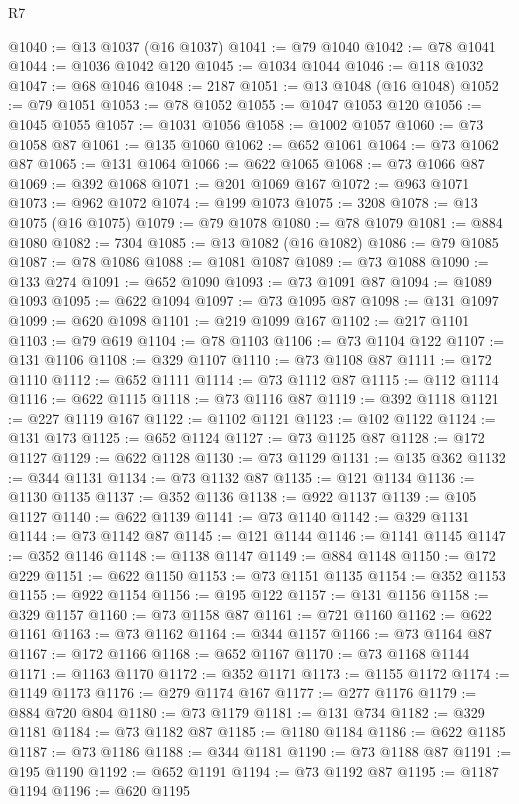 \begin{lexlean}{R7}
\begin{coremodule}
@1040 := @13 @1037 (@16 @1037)
@1041 := @79 @1040
@1042 := @78 @1041
@1044 := @1036 @1042 @120
@1045 := @1034 @1044
@1046 := @118 @1032
@1047 := @68 @1046
@1048 := 2187
@1051 := @13 @1048 (@16 @1048)
@1052 := @79 @1051
@1053 := @78 @1052
@1055 := @1047 @1053 @120
@1056 := @1045 @1055
@1057 := @1031 @1056
@1058 := @1002 @1057
@1060 := @73 @1058 @87
@1061 := @135 @1060
@1062 := @652 @1061
@1064 := @73 @1062 @87
@1065 := @131 @1064
@1066 := @622 @1065
@1068 := @73 @1066 @87
@1069 := @392 @1068
@1071 := @201 @1069 @167
@1072 := @963 @1071
@1073 := @962 @1072
@1074 := @199 @1073
@1075 := 3208
@1078 := @13 @1075 (@16 @1075)
@1079 := @79 @1078
@1080 := @78 @1079
@1081 := @884 @1080
@1082 := 7304
@1085 := @13 @1082 (@16 @1082)
@1086 := @79 @1085
@1087 := @78 @1086
@1088 := @1081 @1087
@1089 := @73 @1088
@1090 := @133 @274
@1091 := @652 @1090
@1093 := @73 @1091 @87
@1094 := @1089 @1093
@1095 := @622 @1094
@1097 := @73 @1095 @87
@1098 := @131 @1097
@1099 := @620 @1098
@1101 := @219 @1099 @167
@1102 := @217 @1101
@1103 := @79 @619
@1104 := @78 @1103
@1106 := @73 @1104 @122
@1107 := @131 @1106
@1108 := @329 @1107
@1110 := @73 @1108 @87
@1111 := @172 @1110
@1112 := @652 @1111
@1114 := @73 @1112 @87
@1115 := @112 @1114
@1116 := @622 @1115
@1118 := @73 @1116 @87
@1119 := @392 @1118
@1121 := @227 @1119 @167
@1122 := @1102 @1121
@1123 := @102 @1122
@1124 := @131 @173
@1125 := @652 @1124
@1127 := @73 @1125 @87
@1128 := @172 @1127
@1129 := @622 @1128
@1130 := @73 @1129
@1131 := @135 @362
@1132 := @344 @1131
@1134 := @73 @1132 @87
@1135 := @121 @1134
@1136 := @1130 @1135
@1137 := @352 @1136
@1138 := @922 @1137
@1139 := @105 @1127
@1140 := @622 @1139
@1141 := @73 @1140
@1142 := @329 @1131
@1144 := @73 @1142 @87
@1145 := @121 @1144
@1146 := @1141 @1145
@1147 := @352 @1146
@1148 := @1138 @1147
@1149 := @884 @1148
@1150 := @172 @229
@1151 := @622 @1150
@1153 := @73 @1151 @1135
@1154 := @352 @1153
@1155 := @922 @1154
@1156 := @195 @122
@1157 := @131 @1156
@1158 := @329 @1157
@1160 := @73 @1158 @87
@1161 := @721 @1160
@1162 := @622 @1161
@1163 := @73 @1162
@1164 := @344 @1157
@1166 := @73 @1164 @87
@1167 := @172 @1166
@1168 := @652 @1167
@1170 := @73 @1168 @1144
@1171 := @1163 @1170
@1172 := @352 @1171
@1173 := @1155 @1172
@1174 := @1149 @1173
@1176 := @279 @1174 @167
@1177 := @277 @1176
@1179 := @884 @720 @804
@1180 := @73 @1179
@1181 := @131 @734
@1182 := @329 @1181
@1184 := @73 @1182 @87
@1185 := @1180 @1184
@1186 := @622 @1185
@1187 := @73 @1186
@1188 := @344 @1181
@1190 := @73 @1188 @87
@1191 := @195 @1190
@1192 := @652 @1191
@1194 := @73 @1192 @87
@1195 := @1187 @1194
@1196 := @620 @1195

\end{coremodule}
\end{lexlean}
